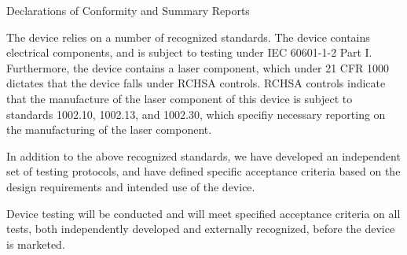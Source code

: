 \newpage
{}
\singlespacing
\begin{center}
  \large{Declarations of Conformity and Summary Reports}
\end{center}

\onehalfspacing

The device relies on a number of recognized standards. The device
contains electrical components, and is subject to testing under IEC
60601-1-2 Part I. Furthermore, the device contains a laser component,
which under 21 CFR 1000 dictates that the device falls under RCHSA
controls. RCHSA controls indicate that the manufacture of the laser
component of this device is subject to standards 1002.10, 1002.13, and
1002.30, which specifiy necessary reporting on the manufacturing of
the laser component. 

In addition to the above recognized standards, we have developed an
independent set of testing protocols, and have defined specific
acceptance criteria based on the design requirements and intended use
of the device.

Device testing will be conducted and will meet specified acceptance
criteria on all tests, both independently developed and externally
recognized, before the device is marketed.


